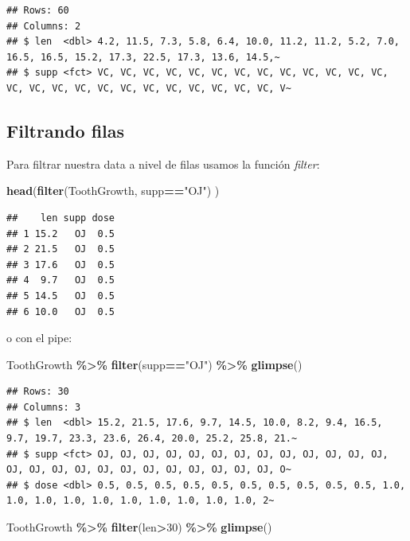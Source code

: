 \documentclass[
]{book}
\newenvironment{Shaded}{\begin{snugshade}}{\end{snugshade}}
\newcommand{\DecValTok}[1]{\textcolor[rgb]{0.00,0.00,0.81}{#1}}
\newcommand{\FunctionTok}[1]{\textcolor[rgb]{0.13,0.29,0.53}{\textbf{#1}}}
\newcommand{\NormalTok}[1]{#1}
\newcommand{\SpecialCharTok}[1]{\textcolor[rgb]{0.81,0.36,0.00}{\textbf{#1}}}
\newcommand{\StringTok}[1]{\textcolor[rgb]{0.31,0.60,0.02}{#1}}
\begin{document}
\begin{verbatim}
## Rows: 60
## Columns: 2
## $ len  <dbl> 4.2, 11.5, 7.3, 5.8, 6.4, 10.0, 11.2, 11.2, 5.2, 7.0, 16.5, 16.5, 15.2, 17.3, 22.5, 17.3, 13.6, 14.5,~
## $ supp <fct> VC, VC, VC, VC, VC, VC, VC, VC, VC, VC, VC, VC, VC, VC, VC, VC, VC, VC, VC, VC, VC, VC, VC, VC, VC, V~
\end{verbatim}

\subsection{Filtrando filas}\label{filtrando-filas-1}

Para filtrar nuestra data a nivel de filas usamos la función \emph{filter}:

\begin{Shaded}
\begin{Highlighting}[]
\FunctionTok{head}\NormalTok{(}\FunctionTok{filter}\NormalTok{(ToothGrowth, supp}\SpecialCharTok{==}\StringTok{"OJ"}\NormalTok{) )}
\end{Highlighting}
\end{Shaded}

\begin{verbatim}
##    len supp dose
## 1 15.2   OJ  0.5
## 2 21.5   OJ  0.5
## 3 17.6   OJ  0.5
## 4  9.7   OJ  0.5
## 5 14.5   OJ  0.5
## 6 10.0   OJ  0.5
\end{verbatim}

o con el pipe:

\begin{Shaded}
\begin{Highlighting}[]
\NormalTok{ToothGrowth }\SpecialCharTok{\%\textgreater{}\%} \FunctionTok{filter}\NormalTok{(supp}\SpecialCharTok{==}\StringTok{"OJ"}\NormalTok{) }\SpecialCharTok{\%\textgreater{}\%} \FunctionTok{glimpse}\NormalTok{()}
\end{Highlighting}
\end{Shaded}

\begin{verbatim}
## Rows: 30
## Columns: 3
## $ len  <dbl> 15.2, 21.5, 17.6, 9.7, 14.5, 10.0, 8.2, 9.4, 16.5, 9.7, 19.7, 23.3, 23.6, 26.4, 20.0, 25.2, 25.8, 21.~
## $ supp <fct> OJ, OJ, OJ, OJ, OJ, OJ, OJ, OJ, OJ, OJ, OJ, OJ, OJ, OJ, OJ, OJ, OJ, OJ, OJ, OJ, OJ, OJ, OJ, OJ, OJ, O~
## $ dose <dbl> 0.5, 0.5, 0.5, 0.5, 0.5, 0.5, 0.5, 0.5, 0.5, 0.5, 1.0, 1.0, 1.0, 1.0, 1.0, 1.0, 1.0, 1.0, 1.0, 1.0, 2~
\end{verbatim}

\begin{Shaded}
\begin{Highlighting}[]
\NormalTok{ToothGrowth }\SpecialCharTok{\%\textgreater{}\%} \FunctionTok{filter}\NormalTok{(len}\SpecialCharTok{\textgreater{}}\DecValTok{30}\NormalTok{) }\SpecialCharTok{\%\textgreater{}\%} \FunctionTok{glimpse}\NormalTok{()}
\end{Highlighting}
\end{Shaded}
\end{document}
